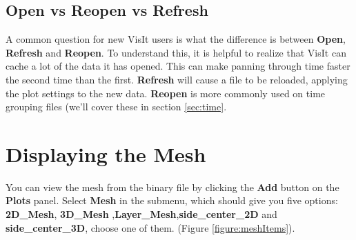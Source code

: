 \documentclass[12pt]{report}
\begin{document}
\subsection{Open vs Reopen vs Refresh}
A common question for new VisIt users is what the difference is between {\bf Open}, {\bf Refresh} and {\bf Reopen}.
To understand this, it is helpful to realize that VisIt can cache a lot of the data it has opened. This can
make panning through time faster the second time than the first. {\bf Refresh} will cause a file to be reloaded,
applying the plot settings to the new data. {\bf Reopen} is more commonly used on time grouping files (we'll cover these
in section \ref{sec:time}.
        
 \section{Displaying the Mesh}
You can view the mesh from the binary file by clicking the {\bf Add} button on the {\bf Plots} panel. Select {\bf Mesh} 
in the submenu, which should give you five options: {\bf 2D\_Mesh}, {\bf 3D\_Mesh} ,{\bf Layer\_Mesh},{\bf side\_center\_2D} and
{\bf side\_center\_3D}, choose one of them.
(Figure \ref{figure:meshItems}).  
\end{document}
